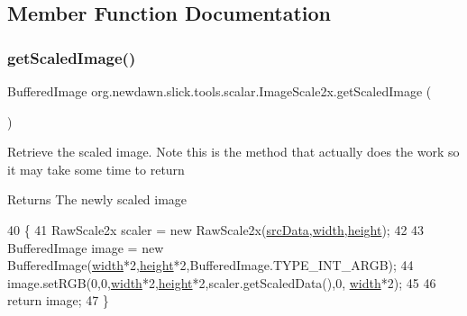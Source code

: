 \subsection{Member Function Documentation}
\mbox{\label{classorg_1_1newdawn_1_1slick_1_1tools_1_1scalar_1_1_image_scale2x_a51f756038a04f55cc16c6f78e545146d}} 
\subsubsection{\texorpdfstring{get\+Scaled\+Image()}{getScaledImage()}}
{\footnotesize\ttfamily Buffered\+Image org.\+newdawn.\+slick.\+tools.\+scalar.\+Image\+Scale2x.\+get\+Scaled\+Image (\begin{DoxyParamCaption}{ }\end{DoxyParamCaption})\hspace{0.3cm}{\ttfamily [inline]}}

Retrieve the scaled image. Note this is the method that actually does the work so it may take some time to return

\begin{DoxyReturn}{Returns}
The newly scaled image 
\end{DoxyReturn}

\begin{DoxyCode}
40     \{
41         RawScale2x scaler = \textcolor{keyword}{new} RawScale2x(\mbox{\hyperlink{classorg_1_1newdawn_1_1slick_1_1tools_1_1scalar_1_1_image_scale2x_a46fef900f8554bbdd22de7e816ebaef3}{srcData}},\mbox{\hyperlink{classorg_1_1newdawn_1_1slick_1_1tools_1_1scalar_1_1_image_scale2x_a026c0d00d9a8c601693fabe4771fdb1a}{width}},\mbox{\hyperlink{classorg_1_1newdawn_1_1slick_1_1tools_1_1scalar_1_1_image_scale2x_a06d02dc2cf0a017990d03ce89441b553}{height}});
42         
43         BufferedImage image = \textcolor{keyword}{new} BufferedImage(\mbox{\hyperlink{classorg_1_1newdawn_1_1slick_1_1tools_1_1scalar_1_1_image_scale2x_a026c0d00d9a8c601693fabe4771fdb1a}{width}}*2,\mbox{\hyperlink{classorg_1_1newdawn_1_1slick_1_1tools_1_1scalar_1_1_image_scale2x_a06d02dc2cf0a017990d03ce89441b553}{height}}*2,BufferedImage.TYPE\_INT\_ARGB);
44         image.setRGB(0,0,\mbox{\hyperlink{classorg_1_1newdawn_1_1slick_1_1tools_1_1scalar_1_1_image_scale2x_a026c0d00d9a8c601693fabe4771fdb1a}{width}}*2,\mbox{\hyperlink{classorg_1_1newdawn_1_1slick_1_1tools_1_1scalar_1_1_image_scale2x_a06d02dc2cf0a017990d03ce89441b553}{height}}*2,scaler.getScaledData(),0,
      \mbox{\hyperlink{classorg_1_1newdawn_1_1slick_1_1tools_1_1scalar_1_1_image_scale2x_a026c0d00d9a8c601693fabe4771fdb1a}{width}}*2);
45         
46         \textcolor{keywordflow}{return} image;
47     \}
\end{DoxyCode}



